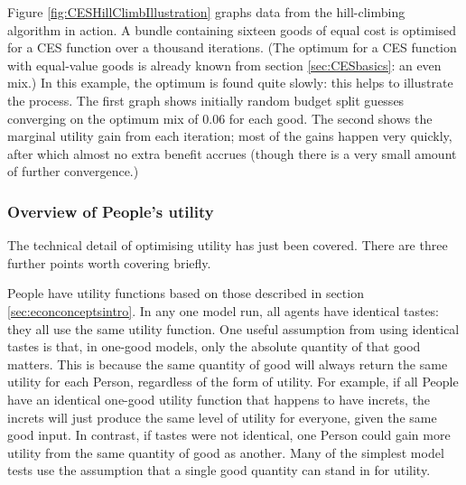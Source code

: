 Figure \ref{fig:CESHillClimbIllustration} graphs data from the hill-climbing algorithm in action. A bundle containing sixteen goods of equal cost is optimised for a CES function over a thousand iterations. (The optimum for a CES function with equal-value goods is  already known from section \ref{sec:CESbasics}: an even mix.) In this example, the optimum is found quite slowly: this helps to illustrate the process. The first graph shows initially random budget split guesses converging on the optimum mix of $0.06$ for each good. The second shows the marginal utility gain from each iteration; most of the gains happen very quickly, after which almost no extra benefit accrues (though there is a very small amount of further convergence.)


\subsubsection{Overview of People's utility \label{sec:frameworkUtility}}

The technical detail of optimising utility has just been covered. There are three further points worth covering briefly.

People have utility functions based on those described in section \ref{sec:econconceptsintro}. In any one model run, all agents have identical tastes: they all use the same utility function. One useful assumption from using identical tastes is that, in one-good models, only the absolute quantity of that good matters. This is because the same quantity of good will always return the same utility for each Person, regardless of the form of utility. For example, if all People have an identical one-good utility function that happens to have \gls{increts}, the \gls{increts} will just produce the same level of utility for everyone, given the same good input. In contrast, if tastes were not identical, one Person could gain more utility from the same quantity of good as another. Many of the simplest model tests use the assumption that a single good quantity can stand in for utility.

